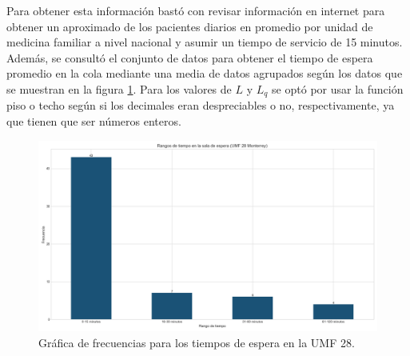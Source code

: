 \documentclass[10pt]{article}
\begin{document}
    Para obtener esta información bastó con revisar información en internet \cite{IMSS2022} para obtener un aproximado de los pacientes diarios en promedio por unidad de medicina familiar a nivel nacional y asumir un tiempo de servicio de 15 minutos. Además, se consultó el conjunto de datos para obtener el tiempo de espera promedio en la cola mediante una media de datos agrupados según los datos que se muestran en la figura \ref{fig:frec_espera_umf28}. Para los valores de $L$ y $L_{q}$ se optó por usar la función piso o techo según si los decimales eran despreciables o no, respectivamente, ya que tienen que ser números enteros.
    
    \begin{figure}[h]
    	\centering
    	\includegraphics[width=130mm]{./images/rangos-tiempo-espera-umf28.png}
    	\caption{Gráfica de frecuencias para los tiempos de espera en la UMF 28.}
    	\label{fig:frec_espera_umf28}
    \end{figure}
    
    \newpage
    
\end{document}
